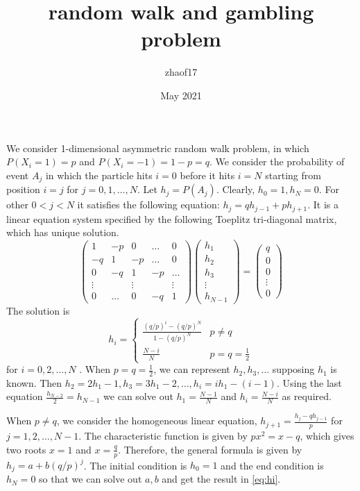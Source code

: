 \documentclass{article}
\title{random walk and gambling problem}
\author{zhaof17 }
\date{May 2021}
\begin{document}
\maketitle

We consider 1-dimensional asymmetric random walk problem, in which $P(X_i=1)=p$
and $P(X_i=-1)=1-p=q$.
We consider the probability of event $A_j$ in which the particle
hits $i=0$ before it hits $i=N$ starting from position $i=j$ for $j=0,1,\dots, N$.
Let $h_j=P(A_j)$.
Clearly, $h_0=1,h_N=0$.
For other $0<j<N$ it satisfies the following
equation: $h_j = qh_{j-1} + ph_{j+1}$.
It is a linear equation system specified by the following Toeplitz tri-diagonal matrix, which has unique solution.
\begin{equation}
    \begin{pmatrix}
    1 & -p & 0 & \dots & 0\\
    -q & 1 & -p & \dots & 0\\
    0 & -q & 1 & -p & \dots \\
    \vdots & & \vdots& & \vdots \\
    0 & \dots &  0 & -q & 1 
    \end{pmatrix}\begin{pmatrix}
    h_1 \\ h_2 \\ h_3 \\ \vdots \\ h_{N-1}
    \end{pmatrix} = \begin{pmatrix}
    q \\ 0 \\ 0 \\ \vdots \\ 0
    \end{pmatrix} 
\end{equation}
The solution is 
\begin{equation}\label{eq:hi}
h_i = 
\begin{cases}
\frac{(q/p)^i - (q/p)^N}{1-(q/p)^{N}} & p\neq q\\
\frac{N-i}{N} & p=q=\frac{1}{2}
\end{cases}    
\end{equation}
for $i=0, 2, \dots, N$
.
When $p=q=\frac{1}{2}$, we can represent
$h_2, h_3, \dots$ supposing $h_1$
is known. Then $h_2=2h_1-1, h_3=3h_1-2,
\dots, h_i=i h_1 - (i-1)$. Using the last
equation $\frac{h_{N-2}}{2}
=h_{N-1}$ we can solve out $h_1=\frac{N-1}{N}$
and $h_i=\frac{N-i}{N}$
as required.

When $p\neq q$, we consider the homogeneous linear
equation, $h_{j+1}=\frac{h_j - q h_{j-1}}{p}$
for $j=1,2,\dots, N-1$.
The characteristic function is given by
$px^2=x-q$, which gives two roots $x=1$
and $x=\frac{q}{p}$.
Therefore, the general formula
is given by $h_j=a+b(q/p)^j$. The initial
condition is $h_0=1$ and the end condition
is $h_N = 0$ so that we can solve out $a,b$
and get the result in \eqref{eq:hi}.
\end{document}
